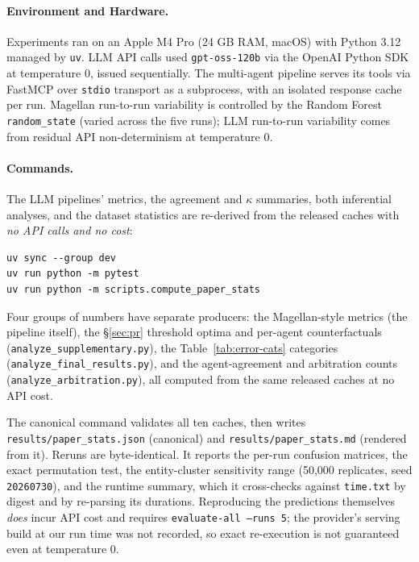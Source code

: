 \documentclass[sigconf]{acmart}
\begin{document}
\paragraph{Environment and Hardware.}
Experiments ran on an Apple M4 Pro (24 GB RAM, macOS) with Python 3.12 managed by \texttt{uv}. LLM API calls used \texttt{gpt-oss-120b} via the OpenAI Python SDK at temperature 0, issued sequentially. The multi-agent pipeline serves its tools via FastMCP over \texttt{stdio} transport as a subprocess, with an isolated response cache per run. Magellan run-to-run variability is controlled by the Random Forest \texttt{random\_state} (varied across the five runs); LLM run-to-run variability comes from residual API non-determinism at temperature 0.

\paragraph{Commands.}
The LLM pipelines' metrics, the agreement and $\kappa$ summaries, both inferential analyses, and the dataset statistics are re-derived from the released caches with \emph{no API calls and no cost}:

\begin{verbatim}
uv sync --group dev
uv run python -m pytest
uv run python -m scripts.compute_paper_stats
\end{verbatim}

\noindent
Four groups of numbers have separate producers: the Magellan-style metrics (the pipeline itself), the \S\ref{sec:pr} threshold optima and per-agent counterfactuals (\texttt{analyze\_supplementary.py}), the Table~\ref{tab:error-cats} categories (\texttt{analyze\_final\_results.py}), and the agent-agreement and arbitration counts (\texttt{analyze\_arbitration.py}), all computed from the same released caches at no API cost.

The canonical command validates all ten caches, then writes \texttt{results/paper\_stats.json} (canonical) and \texttt{results/paper\_stats.md} (rendered from it). Reruns are byte-identical. It reports the per-run confusion matrices, the exact permutation test, the entity-cluster sensitivity range (50,000 replicates, seed \texttt{20260730}), and the runtime summary, which it cross-checks against \texttt{time.txt} by digest and by re-parsing its durations. Reproducing the predictions themselves \emph{does} incur API cost and requires \texttt{evaluate-all --runs 5}; the provider's serving build at our run time was not recorded, so exact re-execution is not guaranteed even at temperature 0.
\end{document}
